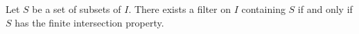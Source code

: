 Let $S$ be a set of subsets of $I$. There exists a filter on $I$ containing $S$ if and only if $S$ has the finite intersection property.
